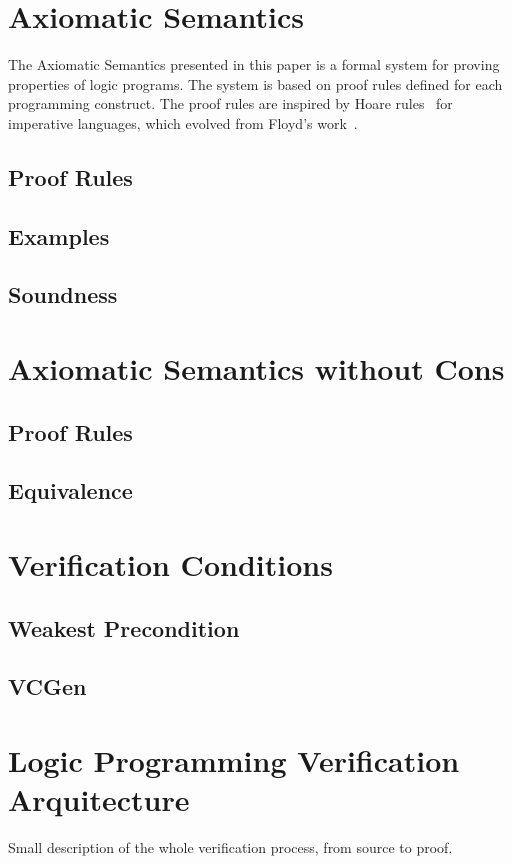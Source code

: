 \subsection{}


\section{Axiomatic Semantics}
\label{sec:ax-sem}
The Axiomatic Semantics presented in this paper is a formal system for
proving properties of logic programs.
%
The system is based on proof rules defined for each programming
construct.
%
The proof rules are inspired by Hoare rules~\cite{} for imperative
languages, which evolved from Floyd's work~\cite{}.
\subsection{Proof Rules}
\subsection{Examples}
\subsection{Soundness}

\section{Axiomatic Semantics without Cons}
\label{sec:ax-sem-wo-cons}
\subsection{Proof Rules}
\subsection{Equivalence}

\section{Verification Conditions}
\label{sec:ver-cond}
\subsection{Weakest Precondition}
\subsection{VCGen}

\section{Logic Programming Verification Arquitecture}
\label{sec:ver-arch}
Small description of the whole verification process, from source to
proof.

